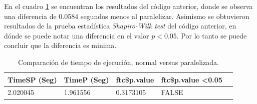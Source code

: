 \documentclass[12pt, letterpaper] {article}
\begin{document}
En el cuadro \ref{dattabla} se encuentran los resultados del código anterior, donde se observa una diferencia de  0.0584 segundos menos al paralelizar. Asimismo se obtuvieron resultados de la prueba estadística \textit{Shapiro-Wilk test} del código anterior, en dónde se puede notar una diferencia en el valor $p< 0.05$. Por lo tanto se puede concluir que la diferencia es minima. 

\begin{table}[H]
\caption{Comparación de tiempo de ejecución, normal versus paralelizada.}
\label{dattabla}
\centering\begin{tabular}{@{}lllll@{}}
\toprule
\cellcolor[HTML]{ECF4FF}TimeSP (Seg) & \cellcolor[HTML]{ECF4FF}TimeP (Seg) & \cellcolor[HTML]{ECF4FF}ftc\$p.value & \cellcolor[HTML]{ECF4FF}ftc\$p.value \textless 0.05 &  \\ \midrule
\cellcolor[HTML]{EFEFEF}2.020045     & \cellcolor[HTML]{EFEFEF}1.961556    & \cellcolor[HTML]{EFEFEF}0.3173105    & \cellcolor[HTML]{EFEFEF}FALSE                       &   \\ \bottomrule
\end{tabular}
\end{table}





\end{document}
